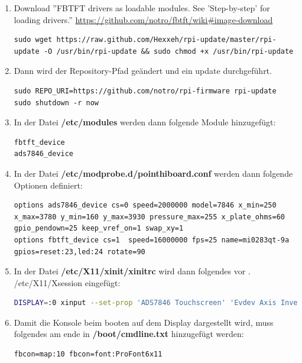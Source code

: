 \documentclass[a4paper,10pt]{article}
\newcommand{\path}[1]{\textcolor{pathcolor}{\textbf{#1}}} %
\begin{document}
\begin{enumerate}
 \item Download ''FBTFT drivers as loadable modules. See 'Step-by-step' for loading drivers.'' \url{https://github.com/notro/fbtft/wiki#image-download}
    \begin{lstlisting}
sudo wget https://raw.github.com/Hexxeh/rpi-update/master/rpi-update -O /usr/bin/rpi-update && sudo chmod +x /usr/bin/rpi-update
    \end{lstlisting}
    
 \item Dann wird der Repository-Pfad geändert und ein update durchgeführt.
    \begin{lstlisting}
sudo REPO_URI=https://github.com/notro/rpi-firmware rpi-update
sudo shutdown -r now
    \end{lstlisting}
 
 \item In der Datei \path{/etc/modules} werden dann folgende Module hinzugefügt:
    \begin{lstlisting}
fbtft_device
ads7846_device
    \end{lstlisting}
    
 \item In der Datei \path{/etc/modprobe.d/pointhiboard.conf} werden dann folgende Optionen definiert:
    \begin{lstlisting}
options ads7846_device cs=0 speed=2000000 model=7846 x_min=250 x_max=3780 y_min=160 y_max=3930 pressure_max=255 x_plate_ohms=60 gpio_pendown=25 keep_vref_on=1 swap_xy=1 
options fbtft_device cs=1  speed=16000000 fps=25 name=mi0283qt-9a gpios=reset:23,led:24 rotate=90
    \end{lstlisting}
    
 \item In der Datei \path{/etc/X11/xinit/xinitrc} wird dann folgendes vor . /etc/X11/Xsession eingefügt:%
    \begin{lstlisting}[language=sh]
DISPLAY=:0 xinput --set-prop 'ADS7846 Touchscreen' 'Evdev Axis Inversion' 1 1
    \end{lstlisting}
    
 \item Damit die Konsole beim booten auf dem Display dargestellt wird, muss folgendes am ende in \path{/boot/cmdline.txt} hinzugefügt werden:
    \begin{lstlisting}
fbcon=map:10 fbcon=font:ProFont6x11
    \end{lstlisting}
\end{enumerate}
\end{document}
